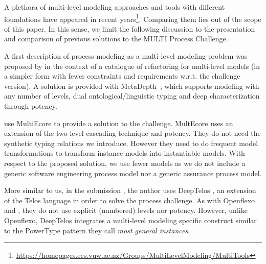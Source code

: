 
A plethora of multi-level modeling approaches and tools with different foundations have appeared in recent years\footnote{\url{https://homepages.ecs.vuw.ac.nz/Groups/MultiLevelModeling/MultiTools}}. Comparing them lies out of the scope of this paper. In this sense, we limit the following discussion to the presentation and comparison of previous solutions to the MULTI Process Challenge.

A first description of process modeling as a multi-level modeling problem was proposed by \parencite{lara2018refactoring} in the context of a catalogue of refactoring for multi-level models (in a simpler form with fewer constraints and requirements w.r.t. the challenge version). A solution is provided with MetaDepth~\parencite{metadepth}, which supports modeling with any number of levels, dual ontological/linguistic typing and deep characterization through potency.

\cite{multiecore2019} use MultiEcore \citep{multecore2016} to provide a solution to the challenge. MultEcore uses an extension of the two-level cascading technique and potency. They do not need the synthetic typing relations we introduce. However they need to do frequent model transformations to transform instance models into instantiable models. With respect to the proposed solution, we use fewer models as we do not include a generic software engineering process model nor a generic assurance process model. %

More similar to us, in the submission \parencite{deeptelos2019}, the author uses DeepTelos \parencite{deeptelos2016}, an extension of the Telos language \parencite{telos1990} in order to solve the process challenge. As with Openflexo and \FML, they do not use explicit (numbered) levels nor potency. However, unlike Openflexo, DeepTelos integrates a multi-level modeling specific construct similar to the PowerType \parencite{atkinson2001essence} pattern they call \emph{most general instances}.


